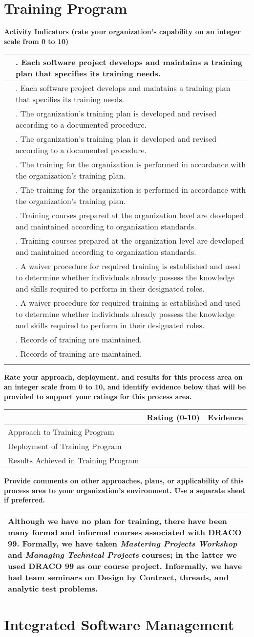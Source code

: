 \documentclass{article}
\newcommand{\KPAname}{}
\let\KPAsection=\section
\renewcommand{\section}[1]{\renewcommand{\KPAname}{#1}\KPAsection{#1}}
\newcounter{activity}[section]		%
\newcounter{approach}[section]
\newcounter{deployment}[section]
\newcounter{result}[section]
\newcounter{NA}[section]
\newcounter{score}
\newenvironment{KPAActivity}
{
    {\bf Activity Indicators (rate your organization's capability
    on an integer scale from 0 to 10)} %
    \begin{center}
    \begin{tabular}{|p{0.5in}|p{6.0in}|} \hline %
}
{
    \end{tabular}
    \end{center}
    \setcounter{approach}{\value{approach}/(\value{activity}-\value{NA})}
    \setcounter{deployment}{\value{deployment}/(\value{activity}-\value{NA})}
    \setcounter{result}{\value{result}/(\value{activity}-\value{NA})}
}
\newcommand{\Activity}[4]
{
    \stepcounter{activity}
    \ifthenelse{\equal{N}{#1}}
    {
	\stepcounter{NA}
	N/A & \arabic{activity}. #4 \\ \hline
    }{
        \setcounter{score}{(#1+#2+#3)/3}
        \setcounter{approach}{\value{approach}+#1}
        \setcounter{deployment}{\value{deployment}+#2}
        \setcounter{result}{\value{result}+#3}
        \arabic{score} & \arabic{activity}. #4 \\ \hline
    }
} %
\newenvironment{KPARate}
{
    {\bf Rate your approach, deployment, and results for
    this process area on an integer scale from 0 to 10, and 
    identify evidence below that will be provided to support your
    ratings for this process area.}
    \begin{center}
    \begin{tabular}{|p{1.0in}|p{0.5in}|p{5.0in}|} \hline
    & Rating (0-10) & \multicolumn{1}{c|}{Evidence} \\ \hline
}
{
    \end{tabular}
    \end{center}
}
\newcommand{\Approach}[1]
{
    Approach to \KPAname & \arabic{approach} & #1 \\ \hline
}
\newcommand{\Deployment}[1]
{
    Deployment of \KPAname & \arabic{deployment} & #1 \\ \hline
}
\newcommand{\Results}[1]
{
    Results Achieved in \KPAname & \arabic{result} & #1 \\ \hline
}
\newenvironment{KPAComment}
{
    {\bf Provide comments on other approaches, plans,
    or applicability of this process area to your organization's
    environment.  Use a separate sheet if preferred.}
    \begin{center}
    \begin{tabular}{|p{6.50in}|} \hline
}
{
    \\ \hline
    \end{tabular}
    \end{center}
}
\begin{document}
\newpage
\section{Training Program}

\begin{KPAActivity}
\Activity{0}{0}{0}{Each software project develops and maintains a training
plan that specifies its training needs.}
\Activity{0}{0}{0}{The organization's training plan is developed and
revised according to a documented procedure.}
\Activity{0}{0}{0}{The training for the organization is performed in
accordance with the organization's training plan.}
\Activity{0}{0}{0}{Training courses prepared at the organization level are
developed and maintained according to organization standards.}
\Activity{0}{0}{0}{A waiver procedure for required training is established
and used to determine whether individuals already possess the
knowledge and skills required to perform in their designated roles.}
\Activity{0}{0}{0}{Records of training are maintained.}
\end{KPAActivity}

\begin{KPARate}
\Approach{}
\Deployment{}
\Results{}
\end{KPARate}

\begin{KPAComment}
Although we have no plan for training, there have been many formal and
informal courses associated with DRACO 99.  Formally, we have taken
{\em Mastering Projects Workshop} and {\em Managing Technical
Projects} courses; in the latter we used DRACO 99 as our course
project.  Informally, we have had team seminars on Design by Contract,
threads, and analytic test problems.
\end{KPAComment}
\newpage
\section{Integrated Software Management}
\end{document}
